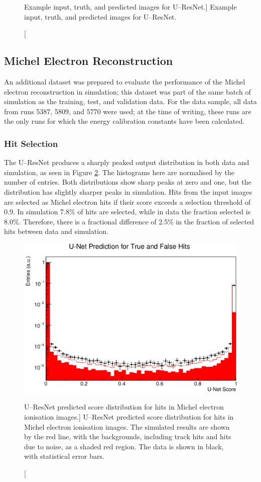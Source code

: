 \begin{figure}
	\caption
	[Example input, truth, and predicted images for U--ResNet.]
	{Example input, truth, and predicted images for U--ResNet.}
	\label{fig:unet_example}
\end{figure}

\subsection{Michel Electron Reconstruction}

An additional dataset was prepared to evaluate the performance of the Michel
electron reconstruction in simulation; this dataset was part of the same batch
of simulation as the training, test, and validation data. For the \protodune{} 
data sample, all data from runs 5387, 5809, and 5770 were used; at the time of 
writing, these runs are the only runs for which the energy calibration 
constants have been calculated.

\subsubsection{Hit Selection}

The U--ResNet produces a sharply peaked output distribution in both data and
simulation, as seen in Figure \ref{fig:unet_pred_data}. The histograms here are
normalised by the number of entries. Both distributions show sharp peaks at zero
and one, but the distribution has slightly sharper peaks in simulation. Hits 
from the input images are selected as Michel electron hits if their score 
exceeds a selection threshold of 0.9. In simulation 7.8\% of hits are 
selected, while in data the fraction selected is 8.0\%. Therefore, there is a 
fractional difference of 2.5\% in the fraction of selected hits between data 
and simulation.  
\begin{figure}
	\centering
	\includegraphics[width=\textwidth]{figures/unet_pred_data.pdf}
	\caption
	[U--ResNet predicted score distribution for hits in Michel electron ionisation
	images.]
	{U--ResNet predicted score distribution for hits in Michel electron
	ionisation images. The simulated results are shown by the red line, with the
	backgrounds, including track hits and hits due to noise, as a shaded red 
	region. The data is shown in black, with statistical error bars.}
	\label{fig:unet_pred_data}
\end{figure}

